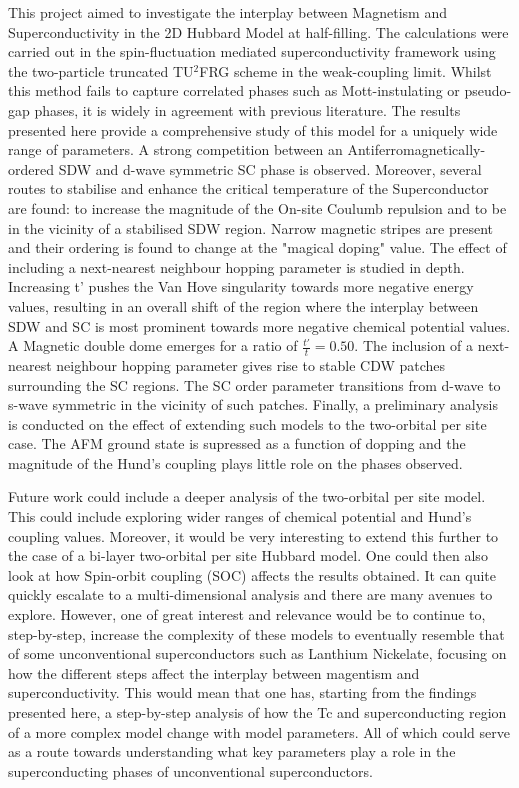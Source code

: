 \documentclass[12pt]{article}
\begin{document}
This project aimed to investigate the interplay between Magnetism and Superconductivity in the 2D Hubbard Model at half-filling. The calculations were carried out
in the spin-fluctuation mediated superconductivity framework using the two-particle truncated TU$^2$FRG scheme in the weak-coupling limit. Whilst this method
fails to capture correlated phases such as Mott-instulating or pseudo-gap phases, it is widely in agreement with previous literature. The results presented here provide
a comprehensive study of this model for a uniquely wide range of parameters. A strong competition between an
Antiferromagnetically-ordered SDW and d-wave symmetric SC phase is observed. Moreover, several routes to stabilise and enhance the critical 
temperature of the Superconductor are found: to increase the magnitude of the On-site Coulumb repulsion and to be in the vicinity of a stabilised SDW region. 
Narrow magnetic stripes are present and their ordering is found to change at the "magical doping" value. The effect of including a next-nearest neighbour hopping parameter 
is studied in depth. Increasing t' pushes the Van Hove singularity towards more negative energy values, resulting in an overall
shift of the region where the interplay between SDW and SC is most prominent towards more negative chemical potential values. A Magnetic double dome emerges for a ratio of $\frac{t'}{t} = 0.50$.
The inclusion of a next-nearest neighbour hopping parameter gives rise to stable CDW patches surrounding the SC regions. The SC order parameter
transitions from d-wave to s-wave symmetric in the vicinity of such patches. Finally, a preliminary analysis is conducted on the effect of
extending such models to the two-orbital per site case. The AFM ground state is supressed as a function of dopping and the magnitude of the Hund's coupling
plays little role on the phases observed.\par
\medskip

\noindent Future work could include a deeper analysis of the two-orbital per site model. This could include exploring wider ranges of chemical potential and Hund's coupling values. Moreover, it
would be very interesting to extend this further to the case of a bi-layer two-orbital per site Hubbard model. 
One could then also look at how Spin-orbit coupling (SOC) affects the results obtained. It can quite quickly escalate to a multi-dimensional analysis and there are many avenues to explore. 
However, one of great interest and relevance would be to continue
to, step-by-step, increase the complexity of these models to eventually resemble that of some unconventional superconductors such as Lanthium Nickelate, focusing on how the different steps
affect the interplay between magentism and superconductivity. This would mean that one has, starting from the findings presented here, 
a step-by-step analysis of how the Tc and superconducting region of a more complex model change with model parameters. All of which could serve
as a route towards understanding what key parameters play a role in the superconducting phases of unconventional superconductors. 






\newpage


\end{document}
